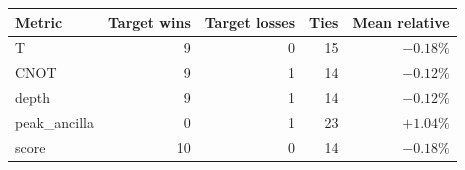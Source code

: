 \begin{tabular}{lrrrr}
\toprule
Metric & Target wins & Target losses & Ties & Mean relative \\
\midrule
T & 9 & 0 & 15 & $-0.18\%$ \\
CNOT & 9 & 1 & 14 & $-0.12\%$ \\
depth & 9 & 1 & 14 & $-0.12\%$ \\
peak_ancilla & 0 & 1 & 23 & $+1.04\%$ \\
score & 10 & 0 & 14 & $-0.18\%$ \\
\bottomrule
\end{tabular}

